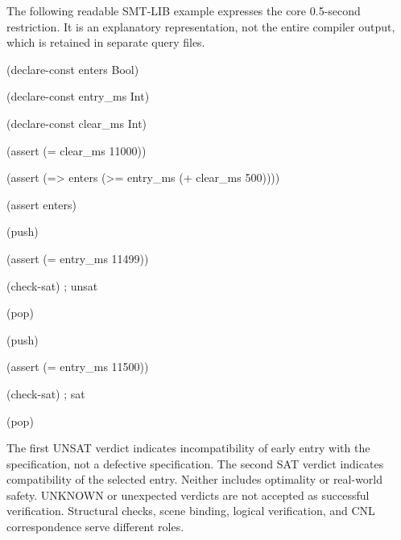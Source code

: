 \documentclass[11pt,a4paper]{article}
\begin{document}
The following readable SMT-LIB example expresses the core 0.5-second restriction. It is an explanatory representation, not the entire compiler output, which is retained in separate query files.\par

\begingroup\small\ttfamily\setlength{\parskip}{1pt}
\noindent\hspace*{0.0em}(declare-const enters Bool)\par
\noindent\hspace*{0.0em}(declare-const entry\_\allowbreak{}ms Int)\par
\noindent\hspace*{0.0em}(declare-const clear\_\allowbreak{}ms Int)\par
\noindent\hspace*{0.0em}(assert (= clear\_\allowbreak{}ms 11000))\par
\noindent\hspace*{0.0em}(assert (=> enters (>= entry\_\allowbreak{}ms (+ clear\_\allowbreak{}ms 500))))\par
\noindent\hspace*{0.0em}(assert enters)\par
\noindent\hspace*{0.0em}(push)\par
\noindent\hspace*{0.0em}(assert (= entry\_\allowbreak{}ms 11499))\par
\noindent\hspace*{0.0em}(check-sat) ; unsat\par
\noindent\hspace*{0.0em}(pop)\par
\noindent\hspace*{0.0em}(push)\par
\noindent\hspace*{0.0em}(assert (= entry\_\allowbreak{}ms 11500))\par
\noindent\hspace*{0.0em}(check-sat) ; sat\par
\noindent\hspace*{0.0em}(pop)\par\endgroup\par

The first UNSAT verdict indicates incompatibility of early entry with the specification, not a defective specification. The second SAT verdict indicates compatibility of the selected entry. Neither includes optimality or real-world safety. UNKNOWN or unexpected verdicts are not accepted as successful verification. Structural checks, scene binding, logical verification, and CNL correspondence serve different roles.\par
\end{document}
